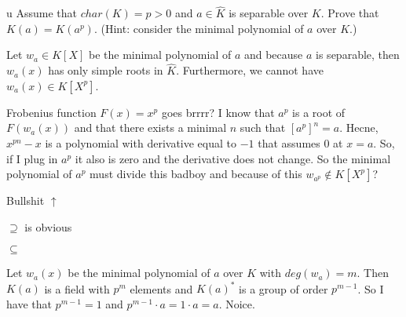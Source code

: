\documentclass{article}
\begin{document}
%
%

\begin{problem}[7]{u}
Assume that $char(K)=p>0$ and $a\in \hat{K}$ is separable over $K$. Prove that $K(a)=K(a^p)$. (Hint: consider the minimal polynomial of $a$ over $K$.)
\end{problem}

Let $w_a\in K[X]$ be the minimal polynomial of $a$ and because $a$ is separable, then $w_a(x)$ has only simple roots in $\hat{K}$. Furthermore, we cannot have $w_a(x)\in K[X^p]$.

Frobenius function $F(x)=x^p$ goes brrrr? I know that $a^p$ is a root of $F(w_a(x))$ and that there exists a minimal $n$ such that $[a^p]^n=a$. Hecne, $x^{pn}-x$ is a polynomial with derivative equal to $-1$ that assumes $0$ at $x=a$. So, if I plug in $a^p$ it also is zero and the derivative does not change. So the minimal polynomial of $a^p$ must divide this badboy and because of this $w_{a^p}\notin K[X^p]$?

Bullshit $\uparrow$

$\supseteq$ is obvious

$\subseteq$


    Let $w_a(x)$ be the minimal polynomial of $a$ over $K$ with $deg(w_a)=m$. Then $K(a)$ is a field with $p^m$ elements and $K(a)^*$ is a group of order $p^{m-1}$. So I have that $p^{m-1}=1$ and $p^{m-1}\cdot a=1\cdot a=a$. Noice.




\end{document}
